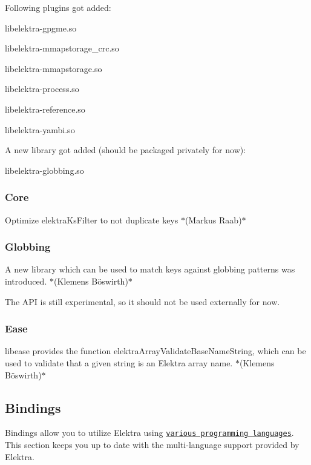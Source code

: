 Following plugins got added\+:


\begin{DoxyItemize}
\item libelektra-\/gpgme.\+so
\item libelektra-\/mmapstorage\+\_\+crc.\+so
\item libelektra-\/mmapstorage.\+so
\item libelektra-\/process.\+so
\item libelektra-\/reference.\+so
\item libelektra-\/yambi.\+so
\end{DoxyItemize}

A new library got added (should be packaged privately for now)\+:


\begin{DoxyItemize}
\item libelektra-\/globbing.\+so
\end{DoxyItemize}

\subsubsection*{Core}

Optimize elektra\+Ks\+Filter to not duplicate keys $\ast$(Markus Raab)$\ast$

\subsubsection*{Globbing}

A new library which can be used to match keys against globbing patterns was introduced. $\ast$(Klemens Böswirth)$\ast$

The A\+PI is still experimental, so it should not be used externally for now.

\subsubsection*{Ease}

{\ttfamily libease} provides the function {\ttfamily elektra\+Array\+Validate\+Base\+Name\+String}, which can be used to validate that a given string is an Elektra array name. $\ast$(Klemens Böswirth)$\ast$

\subsection*{Bindings}

Bindings allow you to utilize Elektra using \href{https://www.libelektra.org/bindings/readme}{\tt various programming languages}. This section keeps you up to date with the multi-\/language support provided by Elektra.

